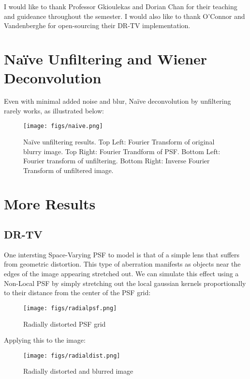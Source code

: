\documentclass[sigconf]{acmart}
\begin{document}
\begin{acks}
I would like to thank Professor Gkioulekas and Dorian Chan for their teaching and guideance throughout the semester. I would also like to thank O'Connor and Vandenberghe for open-sourcing their DR-TV implementation.
\end{acks}





\clearpage
\appendix

\section{Naïve Unfiltering and Wiener Deconvolution}\label{app:naive}
Even with minimal added noise and blur, Naïve deconvolution by unfiltering rarely works, as illustrated below:
\begin{figure}[h]
  \centering
  \texttt{[image: figs/naive.png]}
  \caption{Naïve unfiltering results. Top Left: Fourier Transform of original blurry image. Top Right: Fourier Trandform of PSF. Bottom Left: Fourier transform of unfiltering. Bottom Right: Inverse Fourier Transform of unfiltered image.}
  \label{fig:naive}
\end{figure}


\section{More Results}
\subsection{DR-TV}
One intersting Space-Varying PSF to model is that of a simple lens that suffers from geometric distortion. This type of aberration manifests as objects near the edges of the image appearing stretched out. We can simulate this effect using a Non-Local PSF by simply stretching out the local gaussian kernels proportionally to their distance from the center of the PSF grid:
\begin{figure}[h]
  \centering
  \texttt{[image: figs/radialpsf.png]}
  \caption{Radially distorted PSF grid}
  \label{fig:radialpsf}
\end{figure}

Applying this to the image:
\begin{figure}[h]
  \centering
  \texttt{[image: figs/radialdist.png]}
  \caption{Radially distorted and blurred image}
  \label{fig:radialdist}
\end{figure}
\end{document}
